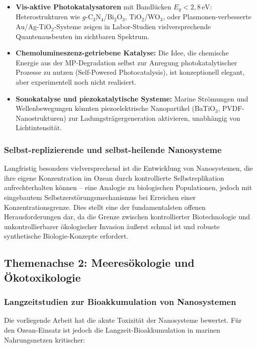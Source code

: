 ﻿\documentclass[12pt,a4paper]{article}
\theoremstyle{definition}
\theoremstyle{remark}
\begin{document}
\begin{itemize}
  \item \textbf{Vis-aktive Photokatalysatoren} mit Bandlücken
        $E_g < 2{,}8\,\text{eV}$: Heterostrukturen wie
        $g\text{-C}_3\text{N}_4$/Bi$_2$O$_3$, TiO$_2$/WO$_3$,
        oder Plasmonen-verbesserte Au/Ag-TiO$_2$-Systeme zeigen
        in Labor-Studien vielversprechende Quantenausbeuten
        im sichtbaren Spektrum.
  \item \textbf{Chemolumineszenz-getriebene Katalyse:} Die Idee, die chemische
        Energie aus der MP-Degradation selbst zur Anregung photokatalytischer
        Prozesse zu nutzen (Self-Powered Photocatalysis), ist konzeptionell
        elegant, aber experimentell noch nicht realisiert.
  \item \textbf{Sonokatalyse und piezokatalytische Systeme:} Marine Strömungen
        und Wellenbewegungen könnten piezoelektrische Nanopartikel
        (BaTiO$_3$, PVDF-Nanostrukturen) zur Ladungsträgergeneration aktivieren,
        unabhängig von Lichtintensität.
\end{itemize}

\subsubsection{Selbst-replizierende und selbst-heilende Nanosysteme}

Langfristig besonders vielversprechend ist die Entwicklung von Nanosystemen,
die ihre eigene Konzentration im Ozean durch kontrollierte Selbstreplikation
aufrechterhalten können -- eine Analogie zu biologischen Populationen, jedoch
mit eingebautem Selbstzerstörungsmechanismus bei Erreichen einer Konzentrationsgrenze.
Dies stellt eine der fundamentalsten offenen Herausforderungen dar, da die
Grenze zwischen kontrollierter Biotechnologie und unkontrollierbarer
ökologischer Invasion äußerst schmal ist und robuste synthetische Biologie-Konzepte
erfordert.

\subsection{Themenachse 2: Meeresökologie und Ökotoxikologie}

\subsubsection{Langzeitstudien zur Bioakkumulation von Nanosystemen}

Die vorliegende Arbeit hat die akute Toxizität der Nanosysteme bewertet.
Für den Ozean-Einsatz ist jedoch die Langzeit-Bioakkumulation in marinen
Nahrungsnetzen kritischer:
\end{document}
